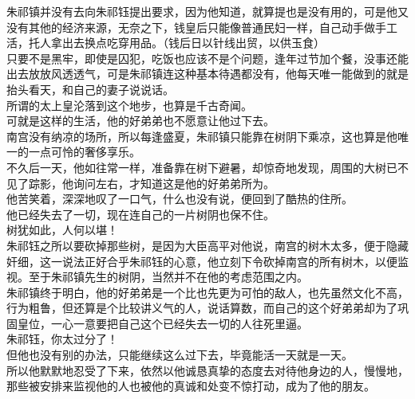 \begin{multicols}{\theparacolNo}
朱祁镇并没有去向朱祁钰提出要求，因为他知道，就算提也是没有用的，可是他又没有其他的经济来源，无奈之下，钱皇后只能像普通民妇一样，自己动手做手工活，托人拿出去换点吃穿用品。（钱后日以针线出贸，以供玉食）\\

只要不是黑牢，即使是囚犯，吃饭也应该不是个问题，逢年过节加个餐，没事还能出去放放风透透气，可是朱祁镇连这种基本待遇都没有，他每天唯一能做到的就是抬头看天，和自己的妻子说说话。\\

所谓的太上皇沦落到这个地步，也算是千古奇闻。\\

可就是这样的生活，他的好弟弟也不愿意让他过下去。\\

南宫没有纳凉的场所，所以每逢盛夏，朱祁镇只能靠在树阴下乘凉，这也算是他唯一的一点可怜的奢侈享乐。\\

不久后一天，他如往常一样，准备靠在树下避暑，却惊奇地发现，周围的大树已不见了踪影，他询问左右，才知道这是他的好弟弟所为。\\

他苦笑着，深深地叹了一口气，什么也没有说，便回到了酷热的住所。\\

他已经失去了一切，现在连自己的一片树阴也保不住。\\

树犹如此，人何以堪！\\

朱祁钰之所以要砍掉那些树，是因为大臣高平对他说，南宫的树木太多，便于隐藏奸细，这一说法正好合乎朱祁钰的心意，他立刻下令砍掉南宫的所有树木，以便监视。至于朱祁镇先生的树阴，当然并不在他的考虑范围之内。\\

朱祁镇终于明白，他的好弟弟是一个比也先更为可怕的敌人，也先虽然文化不高，行为粗鲁，但还算是个比较讲义气的人，说话算数，而自己的这个好弟弟却为了巩固皇位，一心一意要把自己这个已经失去一切的人往死里逼。\\

朱祁钰，你太过分了！\\

但他也没有别的办法，只能继续这么过下去，毕竟能活一天就是一天。\\

所以他默默地忍受了下来，依然以他诚恳真挚的态度去对待他身边的人，慢慢地，那些被安排来监视他的人也被他的真诚和处变不惊打动，成为了他的朋友。\\


\end{multicols}
